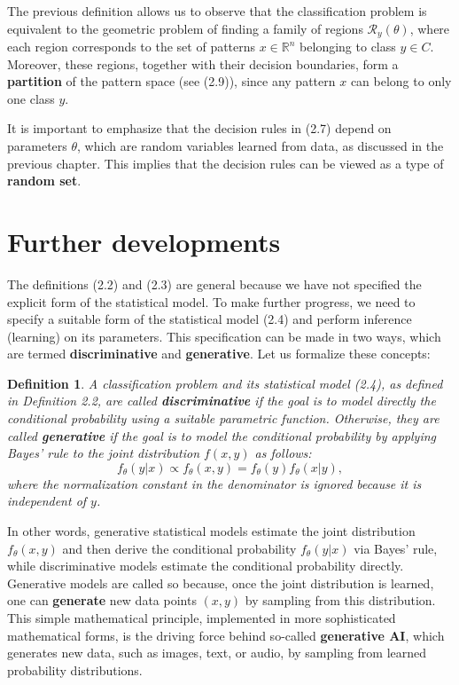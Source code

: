\documentclass{report}
\newtheorem{definition}{Definition}[chapter]
\begin{document}
The previous definition allows us to observe that the classification problem is equivalent to the geometric problem of finding a family of regions $\mathcal{R}_y(\theta)$, where each region corresponds to the set of patterns $x \in \mathbb{R}^n$ belonging to class $y \in C$. Moreover, these regions, together with their decision boundaries, form a \textbf{partition} of the pattern space (see (2.9)), since any pattern $x$ can belong to only one class $y$.

It is important to emphasize that the decision rules in (2.7) depend on parameters $\theta$, which are random variables learned from data, as discussed in the previous chapter. This implies that the decision rules can be viewed as a type of \textbf{random set}.

\section{Further developments}
The definitions (2.2) and (2.3) are general because we have not specified the explicit form of the statistical model. To make further progress, we need to specify a suitable form of the statistical model (2.4) and perform inference (learning) on its parameters. This specification can be made in two ways, which are termed \textbf{discriminative} and \textbf{generative}. Let us formalize these concepts:

\begin{definition}
A classification problem and its statistical model (2.4), as defined in Definition 2.2, are called \textbf{discriminative} if the goal is to model directly the conditional probability using a suitable parametric function. Otherwise, they are called \textbf{generative} if the goal is to model the conditional probability by applying Bayes' rule to the joint distribution $f(x,y)$ as follows:
\begin{equation}
f_\theta(y|x) \propto f_\theta(x,y) = f_\theta(y)f_\theta(x|y),
\end{equation}
where the normalization
constant in the denominator is ignored because it is independent of $y$.
\end{definition}

In other words, generative statistical models estimate the joint distribution $f_\theta(x,y)$ and then derive the conditional probability $f_\theta(y|x)$ via Bayes' rule, while discriminative models estimate the conditional probability directly. Generative models are called so because, once the joint distribution is learned, one can \textbf{generate} new data points $(x,y)$ by sampling from this distribution. This simple mathematical principle, implemented in more sophisticated mathematical forms, is the driving force behind so-called \textbf{generative AI}, which generates new data, such as images, text, or audio, by sampling from learned probability distributions.
\end{document}
